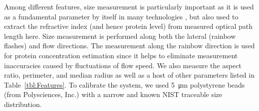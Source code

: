 \documentclass[aps,pra,reprint,longbibliography,superscriptaddress]{revtex4-1}
\begin{document}
Among different features, size measurement is particularly important as it is used as a fundamental parameter by itself in many technologies \cite{adams2008highly, nagrath2007isolation, vona2000isolation, gossett2010label}, but also used to extract the refractive index (and hence protein level) from measured optical path length here. Size measurement is performed along both the lateral (rainbow flashes) and flow directions. The measurement along the rainbow direction is used for protein concentration estimation since it helps to eliminate measurement inaccuracies caused by fluctuations of flow speed. We also measure the aspect ratio, perimeter, and median radius as well as a host of other parameters listed in Table~\ref{tbl:Features}. To calibrate the system, we used \SI{5}{\micro\meter} polystyrene beads (from Polysciences, Inc.) with a narrow and known NIST traceable size distribution.
\end{document}

